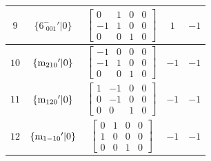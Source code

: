 \documentclass[fleqn,8pt]{jsarticle}
\begin{document}
\begin{longtable}{ccccc}
$ 9 $ & $ \{6^{-}_{\,\,001}{}'|0\} $ & $ \begin{bmatrix} 0 & 1 & 0 & 0 \\ -1 & 1 & 0 & 0 \\ 0 & 0 & 1 & 0 \end{bmatrix} $ & $ 1 $ & $ -1 $ \\ \hline
$ 10 $ & $ \{{\rm m}_{210}{}'|0\} $ & $ \begin{bmatrix} -1 & 0 & 0 & 0 \\ -1 & 1 & 0 & 0 \\ 0 & 0 & 1 & 0 \end{bmatrix} $ & $ -1 $ & $ -1 $ \\ \hline
$ 11 $ & $ \{{\rm m}_{120}{}'|0\} $ & $ \begin{bmatrix} 1 & -1 & 0 & 0 \\ 0 & -1 & 0 & 0 \\ 0 & 0 & 1 & 0 \end{bmatrix} $ & $ -1 $ & $ -1 $ \\ \hline
$ 12 $ & $ \{{\rm m}_{1-10}{}'|0\} $ & $ \begin{bmatrix} 0 & 1 & 0 & 0 \\ 1 & 0 & 0 & 0 \\ 0 & 0 & 1 & 0 \end{bmatrix} $ & $ -1 $ & $ -1 $ \\
\end{longtable}
\end{document}
